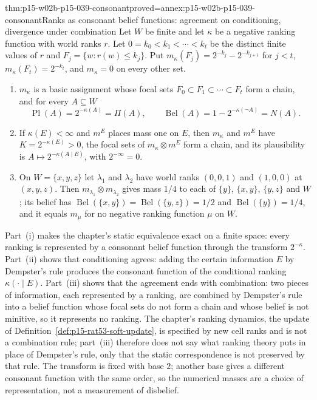 \begin{hbtheorem}{thm:p15-w02b-p15-039-consonant}{proved=annex:p15-w02b-p15-039-consonant}{Ranks as consonant belief functions: agreement on conditioning, divergence under combination}
Let \(W\) be finite and let \(\kappa\) be a negative ranking function with
world ranks \(r\).  Let \(0=k_0<k_1<\cdots<k_t\) be the distinct finite
values of \(r\) and \(F_j=\{w:r(w)\leq k_j\}\).  Put
\(m_\kappa(F_j)=2^{-k_j}-2^{-k_{j+1}}\) for \(j<t\),
\(m_\kappa(F_t)=2^{-k_t}\), and \(m_\kappa=0\) on every other set.
\begin{enumerate}
\item \(m_\kappa\) is a basic assignment whose focal sets
 \(F_0\subset F_1\subset\cdots\subset F_t\) form a chain, and for every
 \(A\subseteq W\)
 \[
  \operatorname{Pl}(A)=2^{-\kappa(A)}=\Pi(A),\qquad
  \operatorname{Bel}(A)=1-2^{-\kappa(\neg A)}=N(A).
 \]
\item If \(\kappa(E)<\infty\) and \(m^E\) places mass one on \(E\), then
 \(m_\kappa\) and \(m^E\) have \(K=2^{-\kappa(E)}>0\), the focal sets of
 \(m_\kappa\otimes m^E\) form a chain, and its plausibility is
 \(A\mapsto2^{-\kappa(A\mid E)}\), with \(2^{-\infty}=0\).
\item On \(W=\{x,y,z\}\) let \(\lambda_1\) and \(\lambda_2\) have world
 ranks \((0,0,1)\) and \((1,0,0)\) at \((x,y,z)\).  Then
 \(m_{\lambda_1}\otimes m_{\lambda_2}\) gives mass \(1/4\) to each of
 \(\{y\}\), \(\{x,y\}\), \(\{y,z\}\) and \(W\); its belief has
 \(\operatorname{Bel}(\{x,y\})=\operatorname{Bel}(\{y,z\})=1/2\) and
 \(\operatorname{Bel}(\{y\})=1/4\), and it equals \(m_\mu\) for no negative
 ranking function \(\mu\) on \(W\).
\end{enumerate}
\end{hbtheorem}

Part~(i) makes the chapter's static equivalence exact on a finite space:
every ranking is represented by a consonant belief function through the
transform \(2^{-\kappa}\).  Part~(ii) shows that conditioning agrees: adding
the certain information \(E\) by Dempster's rule produces the consonant
function of the conditional ranking \(\kappa(\cdot\mid E)\).  Part~(iii) shows
that the agreement ends with combination: two pieces of information, each
represented by a ranking, are combined by Dempster's rule into a belief
function whose focal sets do not form a chain and whose belief is not
minitive, so it represents no ranking.  The chapter's ranking dynamics, the
update of Definition~\ref{def:p15-rat53-soft-update}, is specified by new
cell ranks and is not a combination rule; part~(iii) therefore does not say
what ranking theory puts in place of Dempster's rule, only that the static
correspondence is not preserved by that rule.  The transform is fixed with
base \(2\); another base gives a different consonant function with the same
order, so the numerical masses are a choice of representation, not a
measurement of disbelief.
